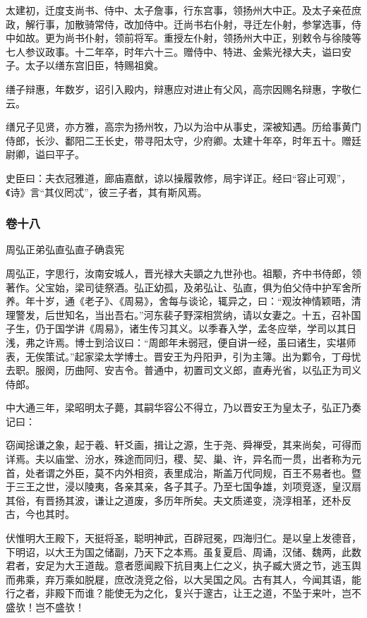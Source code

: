 \documentclass[]{article}
\begin{document}
太建初，迁度支尚书、侍中、太子詹事，行东宫事，领扬州大中正。及太子亲莅庶政，解行事，加散骑常侍，改加侍中。迁尚书右仆射，寻迁左仆射，参掌选事，侍中如故。更为尚书仆射，领前将军。重授左仆射，领扬州大中正，别敕令与徐陵等七人参议政事。十二年卒，时年六十三。赠侍中、特进、金紫光禄大夫，谥曰安子。太子以缮东宫旧臣，特赐祖奠。

缮子辩惠，年数岁，诏引入殿内，辩惠应对进止有父风，高宗因赐名辩惠，字敬仁云。

缮兄子见贤，亦方雅，高宗为扬州牧，乃以为治中从事史，深被知遇。历给事黄门侍郎，长沙、鄱阳二王长史，带寻阳太守，少府卿。太建十年卒，时年五十。赠廷尉卿，谥曰平子。

史臣曰：夫衣冠雅道，廊庙嘉猷，谅以操履敦修，局宇详正。经曰``容止可观''，《诗》言``其仪罔忒''，彼三子者，其有斯风焉。

\hypertarget{header-n4723}{%
\subsubsection{卷十八}\label{header-n4723}}

周弘正弟弘直弘直子确袁宪

周弘正，字思行，汝南安城人，晋光禄大夫顗之九世孙也。祖颙，齐中书侍郎，领著作。父宝始，梁司徒祭酒。弘正幼孤，及弟弘让、弘直，俱为伯父侍中护军舍所养。年十岁，通《老子》、《周易》，舍每与谈论，辄异之，曰：``观汝神情颖晤，清理警发，后世知名，当出吾右。''河东裴子野深相赏纳，请以女妻之。十五，召补国子生，仍于国学讲《周易》，诸生传习其义。以季春入学，孟冬应举，学司以其日浅，弗之许焉。博士到洽议曰：``周郎年未弱冠，便自讲一经，虽曰诸生，实堪师表，无俟策试。''起家梁太学博士。晋安王为丹阳尹，引为主簿。出为鄴令，丁母忧去职。服阕，历曲阿、安吉令。普通中，初置司文义郎，直寿光省，以弘正为司义侍郎。

中大通三年，梁昭明太子薨，其嗣华容公不得立，乃以晋安王为皇太子，弘正乃奏记曰：

窃闻捴谦之象，起于羲、轩爻画，揖让之源，生于尧、舜禅受，其来尚矣，可得而详焉。夫以庙堂、汾水，殊途而同归，稷、契、巢、许，异名而一贯，出者称为元首，处者谓之外臣，莫不内外相资，表里成治，斯盖万代同规，百王不易者也。暨于三王之世，浸以陵夷，各亲其亲，各子其子。乃至七国争雄，刘项竞逐，皇汉扇其俗，有晋扬其波，谦让之道废，多历年所矣。夫文质递变，浇淳相革，还朴反古，今也其时。

伏惟明大王殿下，天挺将圣，聪明神武，百辟冠冕，四海归仁。是以皇上发德音，下明诏，以大王为国之储副，乃天下之本焉。虽复夏启、周诵，汉储、魏两，此数君者，安足为大王道哉。意者愿闻殿下抗目夷上仁之义，执子臧大贤之节，逃玉舆而弗乘，弃万乘如脱屣，庶改浇竞之俗，以大吴国之风。古有其人，今闻其语，能行之者，非殿下而谁？能使无为之化，复兴于邃古，让王之道，不坠于来叶，岂不盛欤！岂不盛欤！
\end{document}
